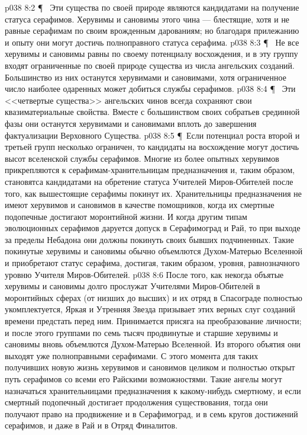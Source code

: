 \vs p038 8:2 \P\ \bibnobreakspace {} Эти существа по своей природе являются кандидатами на получение статуса серафимов. Херувимы и сановимы этого чина --- блестящие, хотя и не равные серафимам по своим врожденным дарованиям; но благодаря прилежанию и опыту они могут достичь полноправного статуса серафима.
\vs p038 8:3 \P\ \bibnobreakspace {} Не все херувимы и сановимы равны по своему потенциалу восхождения, и в эту группу входят ограниченные по своей природе существа из числа ангельских созданий. Большинство из них останутся херувимами и сановимами, хотя ограниченное число наиболее одаренных может добиться службы серафимов.
\vs p038 8:4 \P\ \bibnobreakspace {} Эти <<четвертые существа>> ангельских чинов всегда сохраняют свои квазиматериальные свойства. Вместе с большинством своих собратьев срединной фазы они останутся херувимами и сановимами вплоть до завершения фактуализации Верховного Существа.
\vs p038 8:5 \P\ Если потенциал роста второй и третьей групп несколько ограничен, то кандидаты на восхождение могут достичь высот вселенской службы серафимов. Многие из более опытных херувимов прикрепляются к серафимам\hyp{}хранительницам предназначения и, таким образом, становятса кандидатами на обретение статуса Учителей Миров\hyp{}Обителей после того, как вышестоящие серафимы покинут их. Хранительницы предназначения не имеют херувимов и сановимов в качестве помощников, когда их смертные подопечные достигают моронтийной жизни. И когда другим типам эволюционных серафимов даруется допуск в Серафимоград и Рай, то при выходе за пределы Небадона они должны покинуть своих бывших подчиненных. Такие покинутые херувимы и сановимы обычно объемлются Духом\hyp{}Матерью Вселенной и приобретают статус серафима, достигая, таким образом, уровня, равнозначного уровню Учителя Миров\hyp{}Обителей.
\vs p038 8:6 После того, как некогда объятые херувимы и сановимы долго прослужат Учителями Миров\hyp{}Обителей в моронтийных сферах (от низших до высших) и их отряд в Спасограде полностью укомплектуется, Яркая и Утренняя Звезда призывает этих верных слуг созданий времени предстать перед ним. Принимается присяга на преобразование личности; и после этого группами по семь тысяч продвинутые и старшие херувимы и сановимы вновь объемлются Духом\hyp{}Матерью Вселенной. Из второго объятия они выходят уже полноправными серафимами. С этого момента для таких получивших новую жизнь херувимов и сановимов целиком и полностью открыт путь серафимов со всеми его Райскими возможностями. Такие ангелы могут назначаться хранительницами предназначения к какому\hyp{}нибудь смертному, и если смертный подопечный достигает продолжения существования, тогда они получают право на продвижение и в Серафимоград, и в семь кругов достижений серафимов, и даже в Рай и в Отряд Финалитов.
